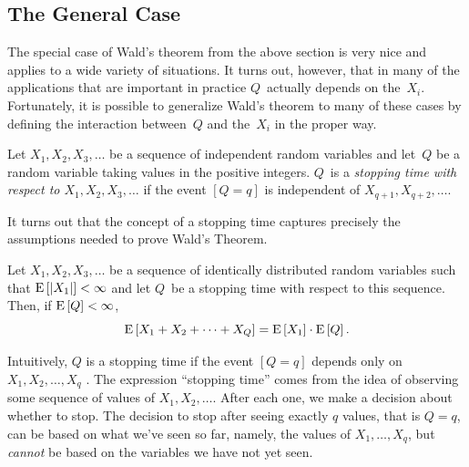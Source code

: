 \documentclass[11pt,twoside]{article}
\begin{document}
\subsection{The General Case}

The special case of Wald's theorem from the above section is very nice
and applies to a wide variety of situations.  It turns out, however,
that in many of the applications that are important in practice
$Q$~actually depends on the~$X_i$.  Fortunately, it is possible to
generalize Wald's theorem to many of these cases by defining the
interaction between~$Q$ and the~$X_i$ in the proper way.
\begin{definition}
  Let $X_1, X_2, X_3, \dots$ be a sequence of independent random
  variables and let~$Q$ be a random variable taking values in the
  positive integers.  $Q$~is a \emph{stopping time with respect to
    $X_1, X_2, X_3, \dots$} if the event $[Q = q]$ is independent
  of $X_{q+1}, X_{q+2}, \dots$.
\end{definition}
It turns out that the concept of a stopping time captures precisely
the assumptions needed to prove Wald's Theorem.
\begin{theorem}
  Let $X_1, X_2, X_3, \dots$ be a sequence of identically distributed
  random variables such that $\mathop{\textup{E}}\nolimits\left[\left|X_1\right|\right] < \infty$
  and let $Q$~be a
  stopping time with respect to this sequence.  Then, if $\mathop{\textup{E}}\nolimits\left[Q\right] <
  \infty$,
  \begin{displaymath}
    \mathop{\textup{E}}\nolimits\left[X_1 + X_2 + \cdots + X_Q\right] = \mathop{\textup{E}}\nolimits\left[X_1\right] \cdot \mathop{\textup{E}}\nolimits\left[Q\right].
  \end{displaymath}
\end{theorem}
Intuitively, $Q$ is a stopping time if the event $[Q = q]$ depends
only on $X_1, X_2, \dots, X_q$ .  The expression ``stopping time''
comes from the idea of observing some sequence of values of $X_1, X_2,
\dots$.  After each one, we make a decision about whether to stop.
The decision to stop after seeing exactly $q$ values, that is $Q=q$,
can be based on what we've seen so far, namely, the values of
$X_1,\dots,X_q$, but \emph{cannot} be based on the variables we have
not yet seen.
\end{document}
